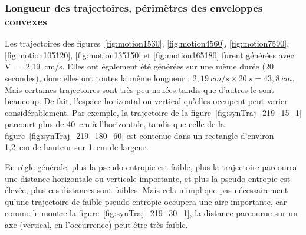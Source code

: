 	\subsubsection{Longueur des trajectoires, périmètres des enveloppes convexes}
	Les trajectoires des figures~\ref{fig:motion1530}, \ref{fig:motion4560}, \ref{fig:motion7590}, \ref{fig:motion105120}, \ref{fig:motion135150} et \ref{fig:motion165180} furent générées avec V~=~2,19~cm/s. Elles ont également été générées sur une même durée (20 secondes), donc elles ont toutes la même longueur : $2,19~cm/s \times 20~s = 43,8~cm$. Mais certaines trajectoires sont très peu \og nouées \fg{} tandis que d'autres le sont beaucoup. De fait, l'espace horizontal ou vertical qu'elles occupent peut varier considérablement. Par exemple, la trajectoire de la figure~\ref{fig:synTraj_219_15_1} parcourt plus de 40~cm à l'horizontale, tandis que celle de la figure~\ref{fig:synTraj_219_180_60} est contenue dans un rectangle d'environ 1,2~cm de hauteur sur 1~cm de largeur.
	
	En règle générale, plus la pseudo-entropie est faible, plus la trajectoire parcourra une distance horizontale ou verticale importante, et plus la pseudo-entropie est élevée, plus ces distances sont faibles. Mais cela n'implique pas nécessairement qu'une trajectoire de faible pseudo-entropie occupera une aire importante, car comme le montre la figure~\ref{fig:synTraj_219_30_1}, la distance parcourue sur un axe (vertical, en l'occurrence) peut être très faible.
	
